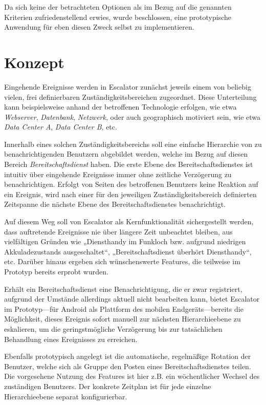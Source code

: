 \documentclass[11pt,utf8,notoc,bibnum,german,final]{zihpub}
\begin{document}
Da sich keine der betrachteten Optionen als im Bezug auf die genannten
Kriterien zufriedenstellend erwies, wurde beschlossen, eine prototypische
Anwendung für eben diesen Zweck selbst zu implementieren.

\section{Konzept}
\label{concept}

Eingehende Ereignisse werden in Escalator zunächst jeweils einem von
beliebig vielen, frei definierbaren Zuständigkeitsbereichen zugeordnet. Diese
Unterteilung kann beispielsweise anhand der betroffenen Technologie erfolgen,
wie etwa \emph{Webserver}, \emph{Datenbank}, \emph{Netzwerk}, oder auch
geographisch motiviert sein, wie etwa \emph{Data Center A}, \emph{Data Center
B}, etc.

Innerhalb eines solchen Zuständigkeitsbereichs soll eine einfache Hierarchie
von zu benachrichtigenden Benutzern abgebildet werden, welche im Bezug auf
diesen Bereich \emph{Bereitschaftsdienst} haben. Die erste Ebene des
Bereitschaftsdienstes ist intuitiv über eingehende Ereignisse immer ohne
zeitliche Verzögerung zu benachrichtigen. Erfolgt von Seiten des betroffenen
Benutzers keine Reaktion auf ein Ereignis, wird nach einer für den jeweiligen
Zuständigkeitsbereich definierten Zeitspanne die nächste Ebene des
Bereitschaftsdienstes benachrichtigt.

Auf diesem Weg soll von Escalator als Kernfunktionalität sichergestellt werden,
dass auftretende Ereignisse nie über längere Zeit unbeachtet bleiben, aus
vielfältigen Gründen wie „Diensthandy im Funkloch bzw. aufgrund niedrigen
Akkuladezustands ausgeschaltet“, „Bereitschaftsdienst überhört Diensthandy“,
etc. Darüber hinaus ergeben sich wünschenswerte Features, die teilweise im
Prototyp bereits erprobt wurden.

Erhält ein Bereitschaftsdienst eine Benachrichtigung, die er zwar registriert,
aufgrund der Umstände allerdings aktuell nicht bearbeiten kann, bietet
Escalator im Prototyp—für Android als Plattform des mobilen Endgeräts—bereits
die Möglichkeit, dieses Ereignis sofort manuell zur nächsten Hierarchieebene zu
eskalieren, um die geringstmögliche Verzögerung bis zur tatsächlichen
Behandlung eines Ereignisses zu erreichen.

Ebenfalls prototypisch angelegt ist die automatische, regelmäßige Rotation der
Benutzer, welche sich als Gruppe den Posten eines Bereitschaftsdienstes teilen.
Die vorgesehene Nutzung des Features ist hier z.B. ein wöchentlicher Wechsel
des zuständigen Benutzers. Der konkrete Zeitplan ist für jede einzelne
Hierarchieebene separat konfigurierbar.
\end{document}
